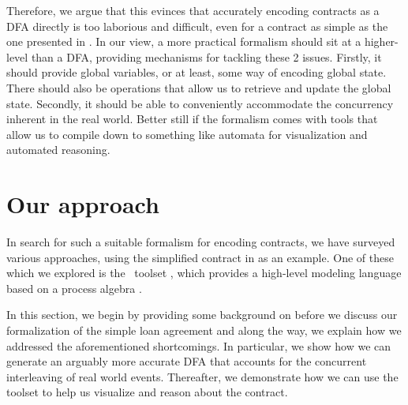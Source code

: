 \documentclass{article}
\begin{document}
Therefore, we argue that this evinces that accurately
encoding contracts as a DFA directly is too laborious and difficult,
even for a contract as simple as the one presented in
\cite[Fig 1.]{contract_as_automaton}.
In our view, a more practical formalism should sit at a higher-level than a DFA,
providing mechanisms for tackling these 2 issues.
Firstly, it should provide global variables, or at least, some way of encoding
global state.
There should also be operations that allow us to retrieve and update the global
state.
Secondly, it should be able to conveniently accommodate the concurrency
inherent in the real world.
Better still if the formalism comes with tools that allow us to compile down
to something like automata for visualization and automated reasoning.


\section{Our approach}

In search for such a suitable formalism for encoding contracts,
we have surveyed various approaches, using the simplified contract in
\cite[Fig 1.]{contract_as_automaton} as an example.
One of these which we explored is the \mcrl \, toolset
\cite{mcrl_toolset}, which provides a high-level modeling language based on a
process algebra \cite{mcrl_book}.

In this section, we begin by providing some background on \mcrl before
we discuss our formalization of the simple loan agreement and along
the way, we explain how we addressed the aforementioned shortcomings.
In particular, we show how we can generate an arguably more accurate DFA that
accounts for the concurrent interleaving of real world events.
Thereafter, we demonstrate how we can use the \mcrl \, toolset to help us
visualize and reason about the contract.
\end{document}
